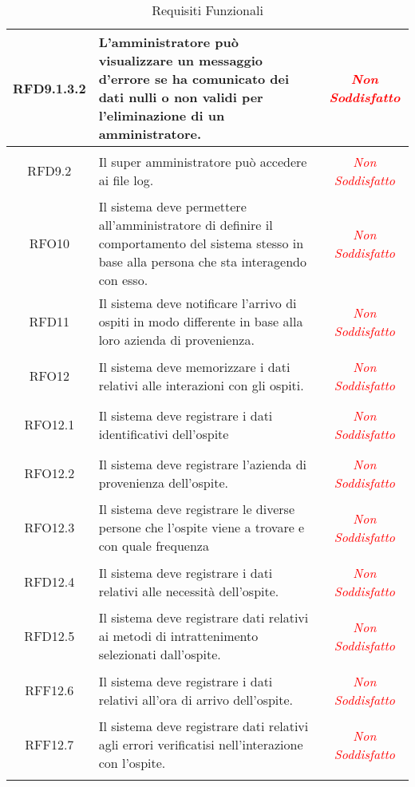 \begin{longtable}{|c|>{\centering}m{7cm}|c|}
\hypertarget{RFD9.1.3.2}{RFD9.1.3.2} & L'amministratore può visualizzare un messaggio d'errore se ha comunicato dei dati nulli o non validi per l'eliminazione di un amministratore. & \textcolor{red}{\textit{Non Soddisfatto}}\\ \hline

\hypertarget{RFD9.2}{RFD9.2} & Il super amministratore può accedere ai file log. & \textcolor{red}{\textit{Non Soddisfatto}}\\ \hline

\hypertarget{RFO10}{RFO10} & Il sistema deve permettere all'amministratore di definire il comportamento del sistema stesso in base alla persona che sta interagendo con esso. & \textcolor{red}{\textit{Non Soddisfatto}}\\ \hline

\hypertarget{RFD11}{RFD11} & Il sistema deve notificare l'arrivo di ospiti in modo differente in base alla loro azienda di provenienza. & \textcolor{red}{\textit{Non Soddisfatto}}\\ \hline

\hypertarget{RFO12}{RFO12} & Il sistema deve memorizzare i dati relativi alle interazioni con gli ospiti. & \textcolor{red}{\textit{Non Soddisfatto}}\\ \hline

\hypertarget{RFO12.1}{RFO12.1} & Il sistema deve registrare i dati identificativi dell'ospite & \textcolor{red}{\textit{Non Soddisfatto}}\\ \hline

\hypertarget{RFO12.2}{RFO12.2} & Il sistema deve registrare l'azienda di provenienza dell'ospite. & \textcolor{red}{\textit{Non Soddisfatto}}\\ \hline

\hypertarget{RFO12.3}{RFO12.3} & Il sistema deve registrare le diverse persone che l'ospite viene a trovare e con quale frequenza & \textcolor{red}{\textit{Non Soddisfatto}}\\ \hline

\hypertarget{RFD12.4}{RFD12.4} & Il sistema deve registrare i dati relativi alle necessità  dell'ospite. & \textcolor{red}{\textit{Non Soddisfatto}}\\ \hline

\hypertarget{RFD12.5}{RFD12.5} & Il sistema deve registrare dati relativi ai metodi di intrattenimento selezionati dall'ospite. & \textcolor{red}{\textit{Non Soddisfatto}}\\ \hline

\hypertarget{RFF12.6}{RFF12.6} & Il sistema deve registrare i dati relativi all'ora di arrivo dell'ospite. & \textcolor{red}{\textit{Non Soddisfatto}}\\ \hline

\hypertarget{RFF12.7}{RFF12.7} & Il sistema deve registrare dati relativi agli errori verificatisi nell'interazione con l'ospite. & \textcolor{red}{\textit{Non Soddisfatto}}\\ \hline

\caption[Requisiti Funzionali]{Requisiti Funzionali}
\label{tabella:req0}
\end{longtable}
\clearpage

